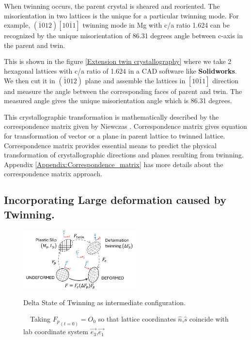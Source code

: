 When twinning occurs, the parent crystal is sheared and reoriented. The misorientation in two lattices is the unique for a particular twinning mode. For example, $(\bar{1}012)[10\bar{1}1]$ twinning mode in Mg with c/a ratio 1.624 can be recognized by the unique misorientation of 86.31 degrees angle between c-axis in the parent and twin.

This is shown in the figure \ref{Extension twin crystallography} where we take 2 hexagonal lattices with c/a ratio of 1.624 in a CAD software like \textbf{Solidworks}. We then cut it in $(\bar{1}012)$ plane and assemble the lattices in $[10\bar{1}1]$ direction and measure the angle between the corresponding faces of parent and twin. The measured angle gives the unique misorientation angle which is 86.31 degrees.

This crystallographic transformation is mathematically described by the correspondence matrix given by Niewczas \cite{Niewczas121}. Correspondence matrix gives equation for transformation of vector or a plane in parent lattice to twinned lattice. Correspondence matrix provides essential means to predict the physical transformation of crystallographic directions and planes resulting from twinning. Appendix \ref{Appendix:Correspondence_matrix} has more details about the correspondence matrix approach.

\subsection{Incorporating Large deformation caused by Twinning.}

\begin{figure}[H]
    \centering
    \includegraphics[width=0.55\textwidth]{images/Delta_twin_as_Intermediate_configuration.pdf}
    \caption{Delta State of Twinning as intermediate configuration.}
    \caption*{\ \ Taking ${F_p}_{(t=0)} = O_0$ so that lattice coordinates $\hat{n}$,$\hat{s}$ coincide with lab coordinate system $\overrightarrow{e_3}$,$\overrightarrow{e_1}$ }
    \label{fig:DeltaStateIntermediateConfig}
\end{figure}

